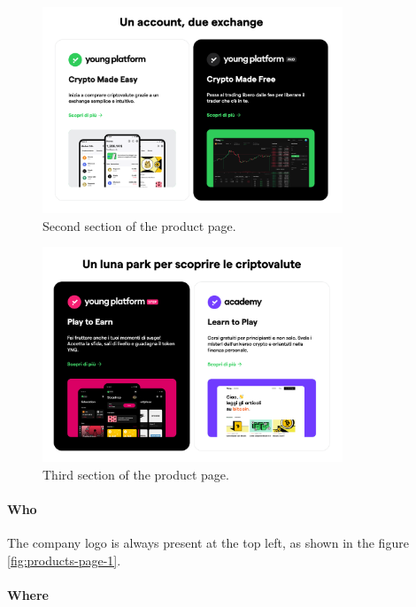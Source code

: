 \begin{figure}[H]
  \centering
  \includegraphics[width=0.80\textwidth]{res/images/internal-pages/products-page/products-page-2.png}
  \caption{Second section of the product page.}
  \label{fig:products-page-2}
\end{figure}

\begin{figure}[H]
  \centering
  \includegraphics[width=0.80\textwidth]{res/images/internal-pages/products-page/products-page-3.png}
  \caption{Third section of the product page.}
  \label{fig:products-page-3}
\end{figure}

\paragraph{Who}

The company logo is always present at the top left, as shown in the figure 
\ref{fig:products-page-1}.

\paragraph{Where}

